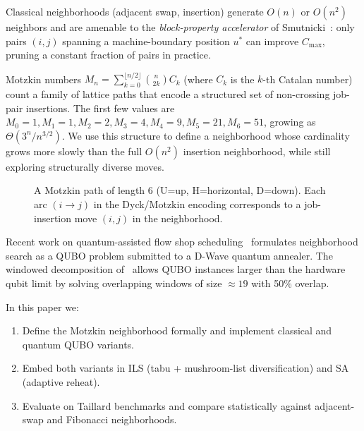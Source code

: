 \documentclass[runningheads]{llncs}
\begin{document}
Classical neighborhoods (adjacent swap, insertion) generate $O(n)$ or $O(n^2)$ neighbors and are amenable to the \emph{block-property accelerator} of Smutnicki~\cite{smutnicki}: only pairs $(i, j)$ spanning a machine-boundary position $u^*$ can improve $C_{\max}$, pruning a constant fraction of pairs in practice.

Motzkin numbers $M_n = \sum_{k=0}^{\lfloor n/2 \rfloor}\binom{n}{2k}C_k$ (where $C_k$ is the $k$-th Catalan number) count a family of lattice paths that encode a structured set of non-crossing job-pair insertions. The first few values are $M_0=1, M_1=1, M_2=2, M_3=4, M_4=9, M_5=21, M_6=51$, growing as $\Theta(3^n / n^{3/2})$. We use this structure to define a neighborhood whose cardinality grows more slowly than the full $O(n^2)$ insertion neighborhood, while still exploring structurally diverse moves.

\begin{figure}[t]
\centering
{}
\caption{A Motzkin path of length 6 (U=up, H=horizontal, D=down). Each arc $(i \to j)$ in the Dyck/Motzkin encoding corresponds to a job-insertion move $(i,j)$ in the neighborhood.}
\label{fig:motzkin}
\end{figure}

Recent work on quantum-assisted flow shop scheduling~\cite{bozejko_quantum,bozejko_qubo} formulates neighborhood search as a QUBO problem submitted to a D-Wave quantum annealer. The windowed decomposition of~\cite{windowed_qubo} allows QUBO instances larger than the hardware qubit limit by solving overlapping windows of size $\approx 19$ with 50\% overlap.

In this paper we:
\begin{enumerate}
\item Define the Motzkin neighborhood formally and implement classical and quantum QUBO variants.
\item Embed both variants in ILS (tabu + mushroom-list diversification) and SA (adaptive reheat).
\item Evaluate on Taillard benchmarks and compare statistically against adjacent-swap and Fibonacci neighborhoods.
\end{enumerate}
\end{document}

